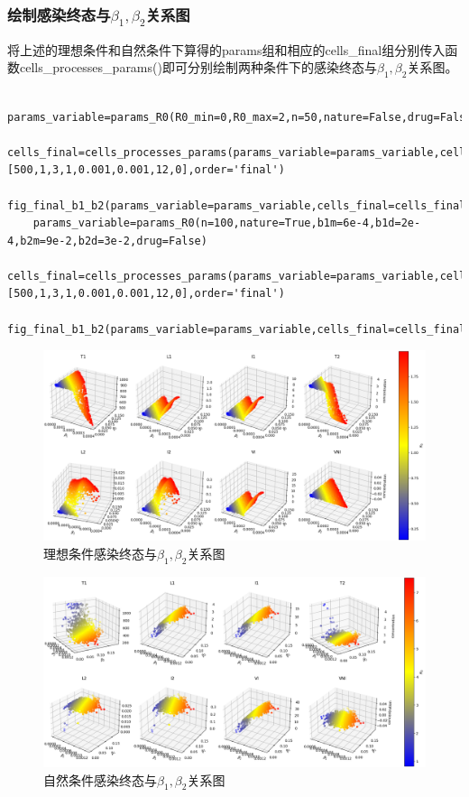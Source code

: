 \documentclass{ctexart}
\begin{document}
    \subsubsection{绘制感染终态与$\beta_{1},\beta_{2}$关系图}
    将上述的理想条件和自然条件下算得的params组和相应的cells\_final组分别传入函数cells\_processes\_params()即可分别绘制两种条件下的感染终态与$\beta_{1},\beta_{2}$关系图。
    \begin{lstlisting}
    params_variable=params_R0(R0_min=0,R0_max=2,n=50,nature=False,drug=False)
    cells_final=cells_processes_params(params_variable=params_variable,cell0=[500,1,3,1,0.001,0.001,12,0],order='final')
    fig_final_b1_b2(params_variable=params_variable,cells_final=cells_final)
    params_variable=params_R0(n=100,nature=True,b1m=6e-4,b1d=2e-4,b2m=9e-2,b2d=3e-2,drug=False)
    cells_final=cells_processes_params(params_variable=params_variable,cell0=[500,1,3,1,0.001,0.001,12,0],order='final')
    fig_final_b1_b2(params_variable=params_variable,cells_final=cells_final)
\end{lstlisting}
    \begin{figure}[H]
        \centering
        \includegraphics[width=\linewidth]{4.1.png}
        \caption{理想条件感染终态与$\beta_{1},\beta_{2}$关系图}
        \label{fig.4.1}
    \end{figure}
    \begin{figure}[H]
        \centering
        \includegraphics[width=\linewidth]{4.2.png}
        \caption{自然条件感染终态与$\beta_{1},\beta_{2}$关系图}
        \label{fig.4.2}
    \end{figure}
\end{document}
